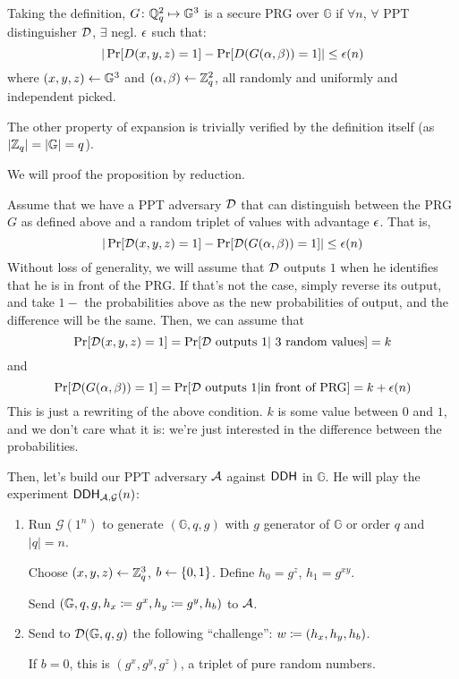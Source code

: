 \begin{solution}
	Taking the definition, $G\colon \mathbb{Q}_q^2 \mapsto \mathbb{G}^3$ is a secure PRG over $\mathbb{G}$ if $\forall n$, $\forall$ PPT distinguisher $\mathcal{D}$, $\exists$ negl. $\epsilon$ such that:
	\[ | \Pr[D(x, y, z)=1] - \Pr[D(G(\alpha, \beta))=1] | \le \epsilon(n) \]
	where $(x, y, z) \leftarrow \mathbb{G}^3$ and $(\alpha, \beta) \leftarrow \mathbb{Z}_q^2$, all randomly and uniformly and independent picked.

	The other property of expansion is trivially verified by the definition itself (as $|\mathbb{Z}_q|=|\mathbb{G}|=q$).

	We will proof the proposition by reduction.

	Assume that we have a PPT adversary $\mathcal{D}$ that can distinguish between the PRG $G$ as defined above and a random triplet of values with advantage $\epsilon$.
	That is,
	\[ | \Pr[\mathcal{D}(x, y, z)=1] - \Pr[\mathcal{D}(G(\alpha, \beta))=1] | \le \epsilon(n) \]
	Without loss of generality, we will assume that $\mathcal{D}$ outputs $1$ when he identifies that he is in front of the PRG.
	If that's not the case, simply reverse its output, and take $1-$ the probabilities above as the new probabilities of output, and the difference will be the same. Then, we can assume that
	\[ \Pr[\mathcal{D}(x, y, z)=1] = \Pr[\mathcal{D} \text{ outputs } 1 | \text{ 3 random values}] = k \]
	and
	\[ \Pr[\mathcal{D}(G(\alpha, \beta))=1] = \Pr[\mathcal{D} \text{ outputs } 1 | \text{in front of PRG}] = k + \epsilon(n) \]
	This is just a rewriting of the above condition. $k$ is some value between $0$ and $1$, and we don't care what it is: we're just interested in the difference between the probabilities.

	Then, let's build our PPT adversary $\mathcal{A}$ against $\mathsf{DDH}$ in $\mathbb{G}$. He will play the experiment $\mathsf{DDH}_{\mathcal{A}, \mathcal{G}}(n)$:
	\begin{enumerate}
		\item Run $\mathcal{G}(1^n)$ to generate $(\mathbb{G}, q, g)$ with $g$ generator of $\mathbb{G}$ or order $q$ and $|q|=n$.

		Choose $(x, y, z) \leftarrow \mathbb{Z}_q^3$, $b \leftarrow \{0, 1\}$. Define $h_0=g^z$, $h_1=g^{xy}$.

		Send $(\mathbb{G}, q, g, h_x \coloneqq g^x, h_y \coloneqq g^y, h_b)$ to $\mathcal{A}$.

		\item Send to $\mathcal{D}(\mathbb{G}, q, g)$ the following ``challenge'': $w \coloneqq (h_x, h_y, h_b)$.

		If $b=0$, this is $(g^x, g^y, g^z)$, a triplet of pure random numbers.


\end{enumerate}
\end{solution}
